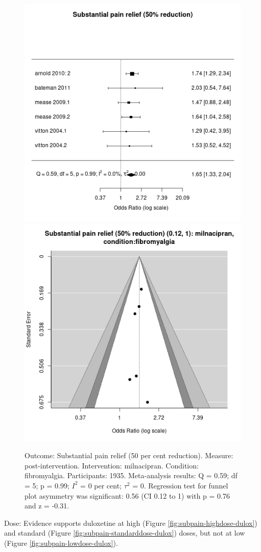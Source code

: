 \documentclass{report}\usepackage[]{graphicx}\usepackage[]{color}
\newenvironment{knitrout}{}{} %
\begin{document}
\begin{figure}

\begin{knitrout}
\color{fgcolor}
\includegraphics[width=0.5\linewidth,height=0.35\textheight]{img/pain_sub-milnacipran-condition-fibromyalgia-forest} 
\includegraphics[width=0.5\linewidth,height=0.35\textheight]{img/pain_sub-milnacipran-condition-fibromyalgia-funnel} 
\end{knitrout}

\caption[Substantial pain: milnacipran, fibromyalgia]{Outcome: Substantial pain relief  (50 per cent reduction). Measure: post-intervention. Intervention: milnacipran. Condition: fibromyalgia. Participants: 1935. Meta-analysis results: Q = 0.59; df = 5; p = 0.99; $I^2$ = 0 per cent; $\tau^2$ = 0. Regression test for funnel plot asymmetry was significant: 0.56 (CI 0.12 to 1) with p = 0.76 and z = -0.31.
}
\label{fig:subpain-fibro-milna}
\end{figure}

Dose: Evidence supports duloxetine at high (Figure \ref{fig:subpain-highdose-dulox}) and standard (Figure \ref{fig:subpain-standarddose-dulox}) doses, but not at low (Figure \ref{fig:subpain-lowdose-dulox}).
\end{document}
